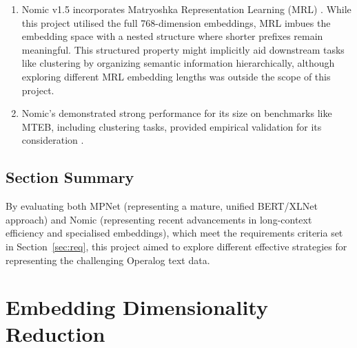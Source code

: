 \documentclass[10pt,oneside]{report}
\begin{document}
\begin{enumerate}
    \item Nomic v1.5 incorporates Matryoshka Representation Learning (MRL) \cite{kusupati2022matryoshka, nussbaum2024nomic1.5}. While this project utilised the full 768-dimension embeddings, MRL imbues the embedding space with a nested structure where shorter prefixes remain meaningful. This structured property might implicitly aid downstream tasks like clustering by organizing semantic information hierarchically, although exploring different MRL embedding lengths was outside the scope of this project.

    \item Nomic's demonstrated strong performance for its size on benchmarks like MTEB, including clustering tasks, provided empirical validation for its consideration \cite{muennighoff2022mteb, nussbaum2024nomicelo}. 
\end{enumerate}

\subsection {Section Summary}

By evaluating both MPNet (representing a mature, unified BERT/XLNet approach) and Nomic (representing recent advancements in long-context efficiency and specialised embeddings), which meet the requirements criteria set in Section~\ref{sec:req}, this project aimed to explore different effective strategies for representing the challenging Operalog text data. 

\section{Embedding Dimensionality Reduction}

\end{document}
